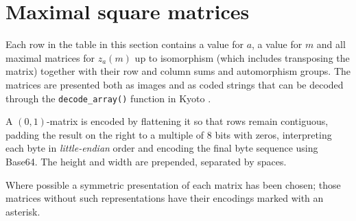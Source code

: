 \documentclass[10pt,a4paper]{article}
\theoremstyle{definition}
\begin{document}
	\section{Maximal square matrices}
	
	Each row in the table in this section contains a value for $a$, a value for $m$ and all maximal matrices for $z_a(m)$ up to isomorphism (which includes transposing the matrix) together with their row and column sums and automorphism groups. The matrices are presented both as images and as coded strings that can be decoded through the \texttt{decode\_array()} function in Kyoto \cite{kyoto}.
	
	A $(0,1)$-matrix is encoded by flattening it so that rows remain contiguous, padding the result on the right to a multiple of 8 bits with zeros, interpreting each byte in \textit{little-endian} order and encoding the final byte sequence using Base64. The height and width are prepended, separated by spaces.
	
	Where possible a symmetric presentation of each matrix has been chosen; those matrices without such representations have their encodings marked with an asterisk.
	
\end{document}
